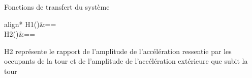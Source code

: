 \documentclass{beamer}
\begin{document}
	\begin{frame}{Fonctions de transfert du système}
		
	\begin{empheq}[left=\empheqlbrace]{align*}
		H1(\omega)&== \\
		H2(\omega)&== 
	\end{empheq}
	\vspace{12 pt}
	
	H2 représente le rapport de l'amplitude de l'accélération ressentie par les occupants de  la tour et de l'amplitude de l'accélération extérieure que subit la tour
	
	
		
		
	\end{frame}
\end{document}
